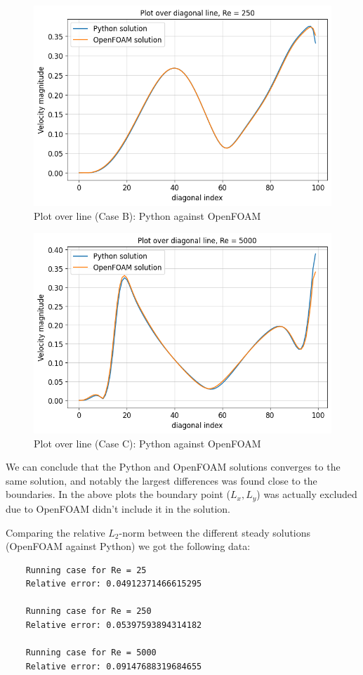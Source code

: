 \documentclass[10pt]{report}
\begin{document}
\begin{figure}[H]
    \centering
    \includegraphics[width = \textwidth]{plots/overline_RE250.png}
    \caption{Plot over line (Case B): Python against OpenFOAM}
\end{figure}
\begin{figure}[H]
    \centering
    \includegraphics[width = \textwidth]{plots/overline_RE5000.png}
    \caption{Plot over line (Case C): Python against OpenFOAM}
\end{figure}
We can conclude that the Python and OpenFOAM solutions converges to the same solution, and notably the largest differences was found close to
the boundaries. In the above plots the boundary point ($L_x,L_y$) was actually excluded due to OpenFOAM didn't include it in the solution.

Comparing the relative $L_2$-norm between the different steady solutions (OpenFOAM against Python) we got the following data:
\begin{lstlisting}
    Running case for Re = 25
    Relative error: 0.04912371466615295

    Running case for Re = 250
    Relative error: 0.05397593894314182

    Running case for Re = 5000
    Relative error: 0.09147688319684655
\end{lstlisting}
\end{document}

